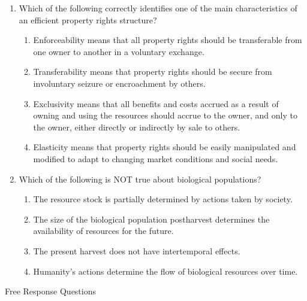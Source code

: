 \documentclass[11pt]{article}
\newcommand{\answer}[1]{\iftoggle{INCLUDEANSWERS}{{\color{violet!70!white}\textbf{Solution:} #1}}{} }
\newcommand{\points}[1]{\iftoggle{INCLUDEPOINTS}{{\color{blue!70!white}(#1 pts.)}}{}}
\begin{document}
\begin{enumerate}
  \answer{(d)}

  \item \points{4} Which of the following correctly identifies one of the main characteristics of an efficient property rights structure?
  \begin{enumerate}
    \item Enforceability means that all property rights should be transferable from one owner to another in a voluntary exchange.
    \item Transferability means that property rights should be secure from involuntary seizure or encroachment by others.
    \item Exclusivity means that all benefits and costs accrued as a result of owning and using the resources should accrue to the owner, and only to the owner, either directly or indirectly by sale to others.
    \item Elasticity means that property rights should be easily manipulated and modified to adapt to changing market conditions and social needs.
  \end{enumerate}

  \answer{(c). Both a and b give wrong definitions of the terms. Elasticity is not a characteristic of property rights.}

  \item \points{4} Which of the following is NOT true about biological populations?
  \begin{enumerate}
    \item The resource stock is partially determined by actions taken by society.
    \item The size of the biological population postharvest determines the availability of resources for the future.
    \item The present harvest does not have intertemporal effects.
    \item Humanity's actions determine the flow of biological resources over time.
  \end{enumerate}

  \answer{(c)}
\end{enumerate}


\vspace*{5mm}
Free Response Questions
\end{document}
